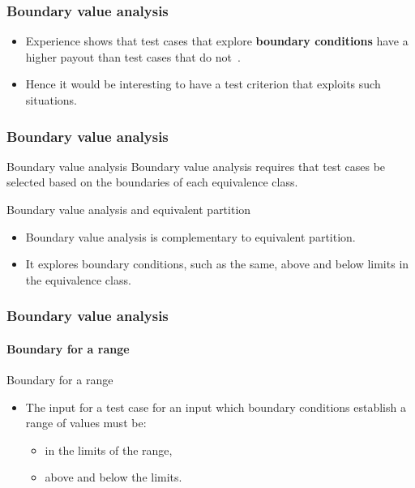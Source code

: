 \begin{frame}[hasprev=false, hasnext=true, parent={concept:functional-testing}]
\frametitle{Boundary value analysis}

\begin{block:fact}{}
\begin{itemize}
	\item Experience shows that test cases that explore \textbf{boundary
	conditions} have a higher payout than test cases that do
	not~\cite[p.~59]{Myers:2004}.

	\item Hence it would be interesting to have a test criterion that
	exploits such situations.
\end{itemize}
\end{block:fact}
\end{frame}


\begin{frame}[hasprev=true, hasnext=true]
\frametitle{Boundary value analysis}
\label{concept:boundary-value-analysis}

\begin{block:concept}{Boundary value analysis}
Boundary value analysis requires that test cases be selected based on the
boundaries of each equivalence class.
\end{block:concept}

\begin{block:fact}{Boundary value analysis and equivalent partition}
\begin{itemize}
	\item Boundary value analysis is complementary to equivalent partition.

	\item It explores boundary conditions, such as the same, above and below
	limits in the equivalence class.
\end{itemize}
\end{block:fact}
\end{frame}


\begin{frame}
\frametitle{Boundary value analysis}
\framesubtitle{Boundary for a range}

\begin{block:fact}{Boundary for a range}
\begin{itemize}
	\item The input for a test case for an input which boundary conditions
	establish a range of values must be:
	\begin{itemize}
		\item in the limits of the range,
		\item above and below the limits.
	\end{itemize}
\end{itemize}
\end{block:fact}
\end{frame}


